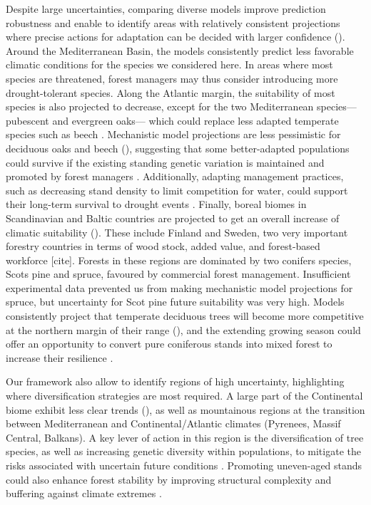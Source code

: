\documentclass[11pt,letter]{article}
\begin{document}
Despite large uncertainties, comparing diverse models improve prediction robustness and enable to identify areas with relatively consistent projections where precise actions for adaptation can be decided with larger confidence ().
Around the Mediterranean Basin, the models consistently predict less favorable climatic conditions for the species we considered here. In areas where most species are threatened, forest managers may thus consider introducing more drought-tolerant species. Along the Atlantic margin, the suitability of most species is also projected to decrease, except for the two Mediterranean species---pubescent and evergreen oaks--- which could replace less adapted temperate species such as beech \citep{Penuelas2003}. Mechanistic model projections are less pessimistic for deciduous oaks and beech (), suggesting that some better-adapted populations could survive if the existing standing genetic variation is maintained and promoted by forest managers \citep{Brang2014}. Additionally, adapting management practices, such as decreasing stand density to limit competition for water, could support their long-term survival to drought events \citep{Young2023}.
Finally, boreal biomes in Scandinavian and Baltic countries are projected to get an overall increase of climatic suitability (). These include Finland and Sweden, two very important forestry countries in terms of wood stock, added value, and forest-based workforce [cite].
Forests in these regions are dominated by two conifers species, Scots pine and spruce, favoured by commercial forest management. Insufficient experimental data prevented us from making mechanistic model projections for spruce, but uncertainty for Scot pine future suitability was very high. Models consistently project that temperate deciduous trees will become more competitive at the northern margin of their range (), and the extending growing season could offer an opportunity to convert pure coniferous stands into mixed forest to increase their resilience \citep{Schauer2023}.

Our framework also allow to identify regions of high uncertainty, highlighting where diversification strategies are most required.
A large part of the Continental biome exhibit less clear trends (), as well as mountainous regions at the transition between Mediterranean and Continental/Atlantic climates (Pyrenees, Massif Central, Balkans). A key lever of action in this region is the diversification of tree species, as well as increasing genetic diversity within populations, to mitigate the risks associated with uncertain future conditions \citep{Morin2014, Ammer2019, Pretzsch2021, Vospernik2024}. Promoting uneven-aged stands could also enhance forest stability by improving structural complexity and buffering against climate extremes \citep{Vangi2024, Zhang2024a}.
\end{document}

